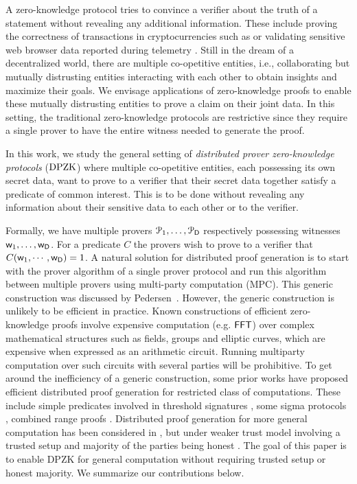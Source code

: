 A zero-knowledge protocol tries to convince a verifier about the truth of a
statement without revealing any additional information. These include proving the correctness of
transactions in cryptocurrencies such as \cite{zerocash} or validating sensitive web browser data reported during
telemetry \cite{prio, MozillaPrio}. Still in the dream of a decentralized world, there are
multiple co-opetitive entities, i.e., collaborating but mutually distrusting entities interacting with each other to obtain insights
and maximize their goals. We envisage applications of zero-knowledge
proofs to enable these mutually
distrusting entities to prove a claim on their joint data. In this setting, the traditional zero-knowledge protocols are restrictive since they require
a single prover to have the entire witness needed to generate the proof. 

In this work, we study the general setting of \textit{distributed prover zero-knowledge protocols} ($\text{DPZK}$) where multiple co-opetitive entities, each possessing its own secret data, want to prove to a verifier that their secret data together satisfy a predicate of common interest. This is to be done without revealing any information
about their sensitive data to each other or to the verifier. 

Formally, we have multiple provers $\mathcal{P}_1, \ldots, \mathcal{P}_{\mathsf{D}}$
respectively possessing witnesses $\mathsf{w}_1, \ldots, \mathsf{w}_{\mathsf{D}}$. For a predicate $C$ the provers wish to prove to a verifier that $C(\mathsf{w}_1,\cdots,\mathsf{w}_{\mathsf{D}}) = 1$.  
A natural solution for distributed
proof generation is to start with the prover algorithm of a single prover
protocol and run this algorithm between multiple provers using multi-party computation (MPC). This generic construction was discussed by Pedersen~\cite{Ped92}. 
However, the generic construction is unlikely to be efficient in practice. Known constructions of efficient zero-knowledge proofs involve
expensive computation (e.g. $\mathsf{FFT}$) over complex mathematical structures such as fields, groups and elliptic curves, which are expensive when expressed
as an arithmetic circuit. Running multiparty computation over such circuits with several parties will be prohibitive. 
To get around the inefficiency of a generic construction, some prior works have proposed efficient distributed proof generation for 
restricted class of computations.
These include simple predicates involved in threshold signatures \cite{DDS}, some sigma protocols \cite{EfficientTZ}, 
combined range proofs \cite{bulletproofs}. Distributed proof generation for more general computation has been considered in \cite{trinocchio}, but under
weaker trust model involving a trusted setup and majority of the parties
being honest \cite{trinocchio}. The goal of this paper is to enable DPZK for general computation without requiring trusted setup or honest majority. 
We summarize our contributions below.

